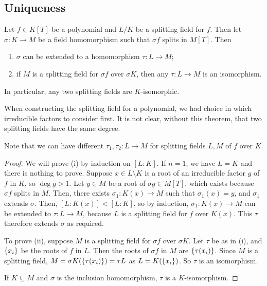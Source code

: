 \subsection{Uniqueness}
\begin{theorem}
	Let \( f \in K[T] \) be a polynomial and \( L / K \) be a splitting field for \( f \).
	Then let \( \sigma \colon K \to M \) be a field homomorphism such that \( \sigma f \) splits in \( M[T] \).
	Then
	\begin{enumerate}
		\item \( \sigma \) can be extended to a homomorphism \( \tau \colon L \to M \);
		\item if \( M \) is a splitting field for \( \sigma f \) over \( \sigma K \), then any \( \tau \colon L \to M \) is an isomorphism.
	\end{enumerate}
	In particular, any two splitting fields are \( K \)-isomorphic.
\end{theorem}
\begin{remark}
	When constructing the splitting field for a polynomial, we had choice in which irreducible factors to consider first.
	It is not clear, without this theorem, that two splitting fields have the same degree.

	Note that we can have different \( \tau_1, \tau_2 \colon L \to M \) for splitting fields \( L, M \) of \( f \) over \( K \).
\end{remark}
\begin{proof}
	We will prove (i) by induction on \( [L : K] \).
	If \( n = 1 \), we have \( L = K \) and there is nothing to prove.
	Suppose \( x \in L \setminus K \) is a root of an irreducible factor \( g \) of \( f \) in \( K \), so \( \deg g > 1 \).
	Let \( y \in M \) be a root of \( \sigma g \in M[T] \), which exists because \( \sigma f \) splits in \( M \).
	Then, there exists \( \sigma_1 \colon K(x) \to M \) such that \( \sigma_1(x) = y \), and \( \sigma_1 \) extends \( \sigma \).
	Then, \( [L : K(x)] < [L : K] \), so by induction, \( \sigma_1 \colon K(x) \to M \) can be extended to \( \tau \colon L \to M \), because \( L \) is a splitting field for \( f \) over \( K(x) \).
	This \( \tau \) therefore extends \( \sigma \) as required.

	To prove (ii), suppose \( M \) is a splitting field for \( \sigma f \) over \( \sigma K \).
	Let \( \tau \) be as in (i), and \( \qty{x_i} \) be the roots of \( f \) in \( L \).
	Then the roots of \( \sigma f \) in \( M \) are \( \qty{\tau(x_i)} \).
	Since \( M \) is a splitting field, \( M = \sigma K(\qty{\tau(x_i)}) = \tau L \) as \( L = K(\qty{x_i}) \).
	So \( \tau \) is an isomorphism.

	If \( K \subseteq M \) and \( \sigma \) is the inclusion homomorphism, \( \tau \) is a \( K \)-isomorphism.
\end{proof}
